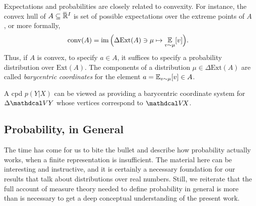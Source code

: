 Expectations and probabilities are closely related to convexity. 
For instance, 
the convex hull of $A \subseteq \mskip1mu\overline{\mskip-1mu\mathbb R\!}\,^I$ 
is set of possible expectations over the extreme points of $A$,
or more formally,
\[
    \mathrm{conv}(A) = \operatorname{\mathrm{im}} 
        \Big( \Delta \mathrm{Ext}(A) \ni \mu \mapsto \operatorname*{\mathbb{E}}_{v \sim \mu} [ v ] \Big).
\]
Thus, if $A$ is convex, to specify $a \in A$, it suffices to specify a probability distribution over $\mathrm{Ext}(A)$.  
The components of a distribution $\mu \in \Delta \mathrm{Ext}(A)$ are called \emph{barycentric coordinates} for the element $a = \operatorname*{\mathbb{E}}_{v \sim \mu}[v] \in A$.


A cpd $p(Y|X)$ can be viewed as providing a barycentric coordinate system for 
$\Delta \V Y$ whose vertices correspond to $\V\!X$. 



% 

%

\subsection{Probability, in General}
    \label{ssec:gen-prob}

The time has come for us to bite the bullet and describe how probability actually works, when a finite representation is insufficient. 
The material here can be interesting and instructive,
    and it is certainly a necessary foundation for our results that talk about distributions over real numbers.
Still, we reiterate that the full account of measure theory needed to define probability in general is more than is necessary to get a deep conceptual understanding of the present work. 


